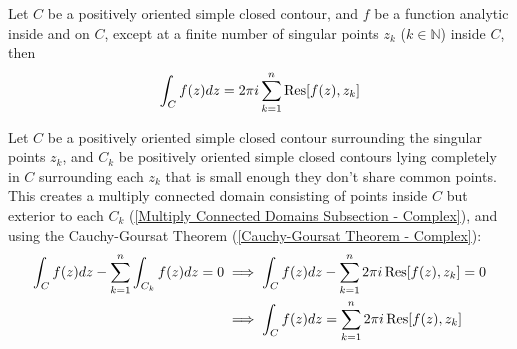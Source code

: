 \documentclass[12pt, english]{book}
\makeatletter
\renewenvironment{proof}[1][\proofname]{\par
	\pushQED{\qed}%
	\normalfont \topsep6\p@\@plus6\p@\relax
	\list{}{%
		\settowidth{\leftmargin}{\itshape\proofname:\hskip\labelsep}%
		\setlength{\labelwidth}{0pt}%
		\setlength{\itemindent}{-\leftmargin}%
	}%
	\item[\hskip\labelsep\itshape#1\@addpunct{:}]\ignorespaces
	}{ \popQED\endlist\@endpefalse}
\makeatother
\begin{document}
	\begin{figure}[H]
		\centering
	\end{figure}
	
	\begin{theorem}
		\label{Cauchy's Residue Theorem - Complex}
		Let \(C\) be a positively oriented simple closed contour, and \(f\) be a function analytic inside and on \(C\), except at a finite number of singular points \(z_k\) (\(k \in \mathbb{N}\)) inside \(C\), then 
		\begin{align*}
			\int_{C} f(z) dz = 2\pi i \sum_{k=1}^{n} \Res[f(z), z_k] 
		\end{align*}
	\end{theorem}
	\begin{proof}
		Let \(C\) be a positively oriented simple closed contour surrounding the singular points \(z_k\), and \(C_k\) be positively oriented simple closed contours lying completely in \(C\) surrounding each \(z_k\) that is small enough they don't share common points. 
		This creates a multiply connected domain consisting of points inside \(C\) but exterior to each \(C_k\) (\cref{Multiply Connected Domains Subsection - Complex}), and using the Cauchy-Goursat Theorem (\cref{Cauchy-Goursat Theorem - Complex}):
		\begin{align*}
			\int_{C} f(z) dz - \sum_{k=1}^{n} \int_{C_k} f(z) dz = 0
			&\implies \int_{C} f(z) dz - \sum_{k=1}^{n} 2\pi i \Res[f(z), z_k]= 0 \\
			&\implies \int_{C} f(z) dz = \sum_{k=1}^{n} 2\pi i \Res[f(z), z_k]
		\end{align*}
	\end{proof}
\end{document}
